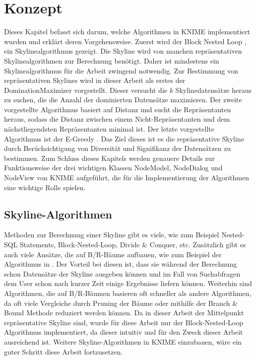 \chapter{Konzept}
\label{ch:Konzept}
Dieses Kapitel befasst sich darum, welche Algorithmen in KNIME implementiert wurden und erklärt deren Vorgehensweise. Zuerst wird der Block Nested Loop \cite{borzsony2001skyline}, ein Skylinealgorithmus gezeigt. Die Skyline wird von manchen repräsentativen Skylinealgorithmen zur Berechnung benötigt. Daher ist mindestens ein Skylinealgorithmus für die Arbeit zwingend notwendig. Zur Bestimmung von repräsentativen Skylines wird in dieser Arbeit als erstes der DominationMaximizer \cite{4221657} vorgestellt. Dieser versucht die $k$ Skylinedatensätze heraus zu suchen, die die Anzahl der dominierten Datensätze maximieren. Der zweite vorgestellte Algorithmus basiert auf Distanz \cite{Tao:2009:DRS:1546683.1547325} und sucht die Repräsentanten heraus, sodass die Distanz zwischen einem Nicht-Repräsentanten und dem nächstliegendsten Repräsentanten minimal ist. Der letzte vorgestellte Algorithmus ist der E-Greedy \cite{magnani2014taking}. Das Ziel dieses ist es die repräsentative Skyline durch Berücksichtigung von Diversität und Signifikanz der Datensätzen zu bestimmen.
Zum Schluss dieses Kapitels werden genauere Details zur Funktionsweise der drei wichtigen Klassen NodeModel, NodeDialog und NodeView von KNIME aufgeführt, die für die Implementierung der Algorithmen eine wichtige Rolle spielen.
\section{Skyline-Algorithmen}
\label{ch:Analyse:sec:skyAlgos}
Methoden zur Berechnung einer Skyline gibt es viele, wie zum Beispiel Nested-SQL Statements, Block-Nested-Loop, Divide \& Conquer, etc.
Zusätzlich gibt es auch viele Ansätze, die auf B/R-Bäume aufbauen, wie zum Beispiel der Algorithmus in \cite{Papadias:2003:OPA:872757.872814}. Der Vorteil bei diesen ist, dass sie während der Berechnung schon Datensätze der Skyline ausgeben können und im Fall von Suchabfragen dem User schon nach kurzer Zeit einige Ergebnisse liefern können. Weiterhin sind Algorithmen, die auf B/R-Bäumen basieren oft schneller als andere Algorithmen, da oft viele Vergleiche durch Pruning der Bäume oder mithilfe der Branch \& Bound Methode reduziert werden können. 
Da in dieser Arbeit der Mittelpunkt repräsentative Skyline sind, wurde für diese Arbeit nur der Block-Nested-Loop Algorithmus implementiert, da dieser intuitiv und für den Zweck dieser Arbeit ausreichend ist. Weitere Skyline-Algorithmen in KNIME einzubauen, wäre ein guter Schritt diese Arbeit fortzusetzen. 

